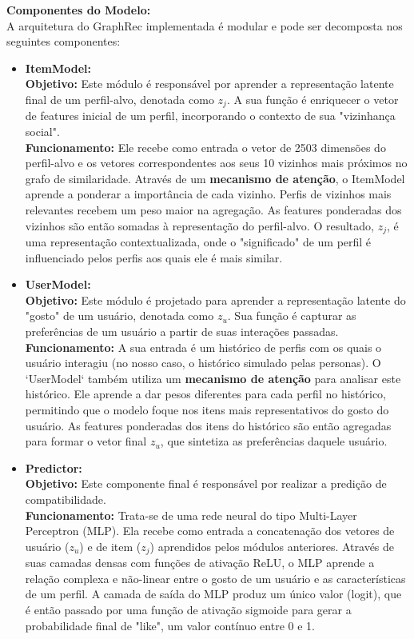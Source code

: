 \textbf{Componentes do Modelo:} \\
A arquitetura do GraphRec implementada é modular e pode ser decomposta nos seguintes componentes:

\begin{itemize}
    \item \textbf{ItemModel:}
    \\ \textbf{Objetivo:} Este módulo é responsável por aprender a representação latente final de um perfil-alvo, denotada como $z_j$. A sua função é enriquecer o vetor de features inicial de um perfil, incorporando o contexto de sua "vizinhança social".
    \\ \textbf{Funcionamento:} Ele recebe como entrada o vetor de 2503 dimensões do perfil-alvo e os vetores correspondentes aos seus 10 vizinhos mais próximos no grafo de similaridade. Através de um \textbf{mecanismo de atenção}, o ItemModel aprende a ponderar a importância de cada vizinho. Perfis de vizinhos mais relevantes recebem um peso maior na agregação. As features ponderadas dos vizinhos são então somadas à representação do perfil-alvo. O resultado, $z_j$, é uma representação contextualizada, onde o "significado" de um perfil é influenciado pelos perfis aos quais ele é mais similar.

    \item \textbf{UserModel:}
    \\ \textbf{Objetivo:} Este módulo é projetado para aprender a representação latente do "gosto" de um usuário, denotada como $z_u$. Sua função é capturar as preferências de um usuário a partir de suas interações passadas.
    \\ \textbf{Funcionamento:} A sua entrada é um histórico de perfis com os quais o usuário interagiu (no nosso caso, o histórico simulado pelas personas). O `UserModel` também utiliza um \textbf{mecanismo de atenção} para analisar este histórico. Ele aprende a dar pesos diferentes para cada perfil no histórico, permitindo que o modelo foque nos itens mais representativos do gosto do usuário. As features ponderadas dos itens do histórico são então agregadas para formar o vetor final $z_u$, que sintetiza as preferências daquele usuário.

    \item \textbf{Predictor:}
    \\ \textbf{Objetivo:} Este componente final é responsável por realizar a predição de compatibilidade.
    \\ \textbf{Funcionamento:} Trata-se de uma rede neural do tipo Multi-Layer Perceptron (MLP). Ela recebe como entrada a concatenação dos vetores de usuário ($z_u$) e de item ($z_j$) aprendidos pelos módulos anteriores. Através de suas camadas densas com funções de ativação ReLU, o MLP aprende a relação complexa e não-linear entre o gosto de um usuário e as características de um perfil. A camada de saída do MLP produz um único valor (logit), que é então passado por uma função de ativação sigmoide para gerar a probabilidade final de "like", um valor contínuo entre 0 e 1.
\end{itemize}

